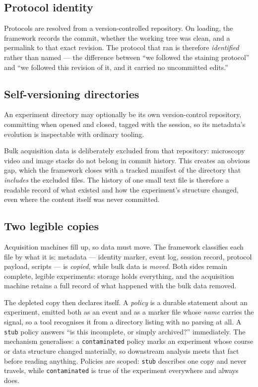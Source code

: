 \documentclass[10pt,a4paper,twocolumn]{article}
\begin{document}
\subsection{Protocol identity}
Protocols are resolved from a version-controlled repository. On loading, the
framework records the commit, whether the working tree was clean, and a permalink to
that exact revision. The protocol that ran is therefore \emph{identified} rather than
named --- the difference between ``we followed the staining protocol'' and ``we
followed this revision of it, and it carried no uncommitted edits.''

\subsection{Self-versioning directories}
An experiment directory may optionally be its own version-control repository,
committing when opened and closed, tagged with the session, so its metadata's evolution
is inspectable with ordinary tooling.

Bulk acquisition data is deliberately excluded from that repository: microscopy video
and image stacks do not belong in commit history. This creates an obvious gap, which
the framework closes with a tracked manifest of the directory that \emph{includes}
the excluded files. The history of one small text file is therefore a readable record
of what existed and how the experiment's structure changed, even where the content
itself was never committed.

\subsection{Two legible copies}
Acquisition machines fill up, so data must move. The framework classifies each file by
what it is: metadata --- identity marker, event log, session record, protocol payload,
scripts --- is \emph{copied}, while bulk data is \emph{moved}. Both sides remain
complete, legible experiments: storage holds everything, and the acquisition machine
retains a full record of what happened with the bulk data removed.

The depleted copy then declares itself. A \emph{policy} is a durable statement about
an experiment, emitted both as an event and as a marker file whose \emph{name} carries
the signal, so a tool recognises it from a directory listing with no parsing at all. A
\texttt{stub} policy answers ``is this incomplete, or simply archived?'' immediately.
The mechanism generalises: a \texttt{contaminated} policy marks an experiment whose
course or data structure changed materially, so downstream analysis meets that fact
before reading anything. Policies are scoped: \texttt{stub} describes one copy and
never travels, while \texttt{contaminated} is true of the experiment everywhere and
always does.
\end{document}
